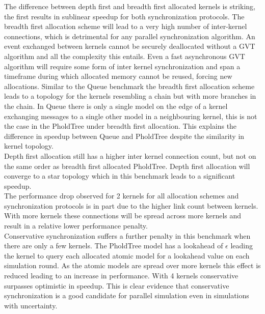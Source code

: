 The difference between depth first and breadth first allocated kernels is striking, the first results in sublinear speedup for both synchronization protocols. %
The breadth first allocation scheme will lead to a very high number of inter-kernel connections, which is detrimental for any parallel synchronization algorithm. An event exchanged between kernels cannot be securely deallocated without a GVT algorithm and all the complexity this entails. Even a fast asynchronous GVT algorithm will require some form of inter kernel synchronization and span a timeframe during which allocated memory cannot be reused, forcing new allocations.
Similar to the Queue benchmark the breadth first allocation scheme leads to a topology for the kernels resembling a chain but with more branches in the chain. In Queue there is only a single model on the edge of a kernel exchanging messages to a single other model in a neighbouring kernel, this is not the case in the PholdTree under breadth first allocation. This explains the difference in speedup between Queue and PholdTree despite the similarity in kernel topology.\\
Depth first allocation still has a higher inter kernel connection count, but not on the same order as breadth first allocated PholdTree. Depth first allocation will converge to a star topology which in this benchmark leads to a significant speedup.\\
The performance drop observed for 2 kernels for all allocation schemes and synchronization protocols is in part due to the higher link count between kernels. With more kernels these connections will be spread across more kernels and result in a relative lower performance penalty. \\
Conservative synchronization suffers a further penalty in this benchmark when there are only a few kernels. The PholdTree model has a lookahead of $\epsilon$ leading the kernel to query each allocated atomic model for a lookahead value on each simulation round. As the atomic models are spread over more kernels this effect is reduced leading to an increase in performance. With 4 kernels conservative surpasses optimistic in speedup. This is clear evidence that conservative synchronization is a good candidate for parallel simulation even in simulations with uncertainty.
